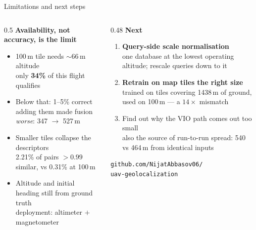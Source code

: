 \documentclass[aspectratio=169]{beamer}
\begin{document}
\begin{frame}{Limitations and next steps}
\begin{columns}[T]
\begin{column}{0.5\textwidth}
\textbf{Availability, not accuracy, is the limit}
\begin{itemize}
\item 100\,m tile needs $\sim$66\,m altitude\\
      {\small only \textbf{34\%} of this flight qualifies}
\item Below that: 1--5\% correct\\
      {\small adding them made fusion \emph{worse}: 347 $\rightarrow$ 527\,m}
\item Smaller tiles collapse the descriptors\\
      {\small 2.21\% of pairs $>0.99$ similar, vs 0.31\% at 100\,m}
\item Altitude and initial heading still from ground truth\\
      {\small deployment: altimeter $+$ magnetometer}
\end{itemize}
\end{column}
\begin{column}{0.48\textwidth}
\textbf{Next}
\begin{enumerate}
\item \textbf{Query-side scale normalisation}\\
      {\small one database at the lowest operating altitude; rescale queries down to it}
\item \textbf{Retrain on map tiles the right size}\\
      {\small trained on tiles covering 1438\,m of ground, used on 100\,m ---
      a $14\times$ mismatch}
\item Find out why the VIO path comes out too small\\
      {\small also the source of run-to-run spread: 540 vs 464\,m from
      identical inputs}
\end{enumerate}

\vspace{1.5em}
\centering
\footnotesize
\texttt{github.com/NijatAbbasov06/}\\
\texttt{uav-geolocalization}
\end{column}
\end{columns}
\end{frame}
\end{document}
